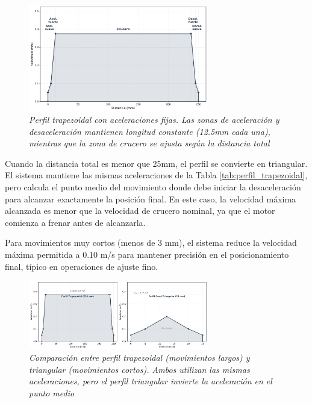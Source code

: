 \begin{figure}[H]
    \centering
    \includegraphics[width=0.7\textwidth]{imagenes/perfil_trapezoidal_velocidad.png}
    \caption{\textit{Perfil trapezoidal con aceleraciones fijas. Las zonas de aceleración y desaceleración mantienen longitud constante (12.5mm cada una), mientras que la zona de crucero se ajusta según la distancia total}}
    \label{fig:perfil_trapezoidal}
\end{figure}

Cuando la distancia total es menor que 25mm, el perfil se convierte en triangular. El sistema mantiene las mismas aceleraciones de la Tabla \ref{tab:perfil_trapezoidal}, pero calcula el punto medio del movimiento donde debe iniciar la desaceleración para alcanzar exactamente la posición final. En este caso, la velocidad máxima alcanzada es menor que la velocidad de crucero nominal, ya que el motor comienza a frenar antes de alcanzarla. 

Para movimientos muy cortos (menos de 3 mm), el sistema reduce la velocidad máxima permitida a 0.10 m/s para mantener precisión en el posicionamiento final, típico en operaciones de ajuste fino.

\begin{figure}[H]
    \centering
    \includegraphics[width=0.7\textwidth]{imagenes/perfil_trapezoidal_triangular.png}
    \caption{\textit{Comparación entre perfil trapezoidal (movimientos largos) y triangular (movimientos cortos). Ambos utilizan las mismas aceleraciones, pero el perfil triangular invierte la aceleración en el punto medio}}
    \label{fig:perfil_comparacion}
\end{figure}

